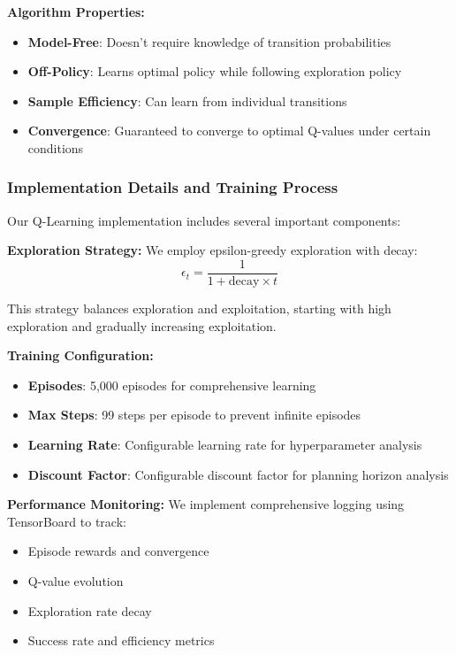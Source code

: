 \documentclass[12pt]{article}
\begin{document}
{{{\textbf{Algorithm Properties:}
\begin{itemize}
    \item \textbf{Model-Free}: Doesn't require knowledge of transition probabilities
    \item \textbf{Off-Policy}: Learns optimal policy while following exploration policy
    \item \textbf{Sample Efficiency}: Can learn from individual transitions
    \item \textbf{Convergence}: Guaranteed to converge to optimal Q-values under certain conditions
\end{itemize}

\subsubsection{Implementation Details and Training Process}

Our Q-Learning implementation includes several important components:

\textbf{Exploration Strategy:}
We employ epsilon-greedy exploration with decay:
\begin{equation}
\epsilon_t = \frac{1}{1 + \text{decay} \times t}
\end{equation}

This strategy balances exploration and exploitation, starting with high exploration and gradually increasing exploitation.

\textbf{Training Configuration:}
\begin{itemize}
    \item \textbf{Episodes}: 5,000 episodes for comprehensive learning
    \item \textbf{Max Steps}: 99 steps per episode to prevent infinite episodes
    \item \textbf{Learning Rate}: Configurable learning rate for hyperparameter analysis
    \item \textbf{Discount Factor}: Configurable discount factor for planning horizon analysis
\end{itemize}

\textbf{Performance Monitoring:}
We implement comprehensive logging using TensorBoard to track:
\begin{itemize}
    \item Episode rewards and convergence
    \item Q-value evolution
    \item Exploration rate decay
    \item Success rate and efficiency metrics
\end{itemize}

}}}
\end{document}
